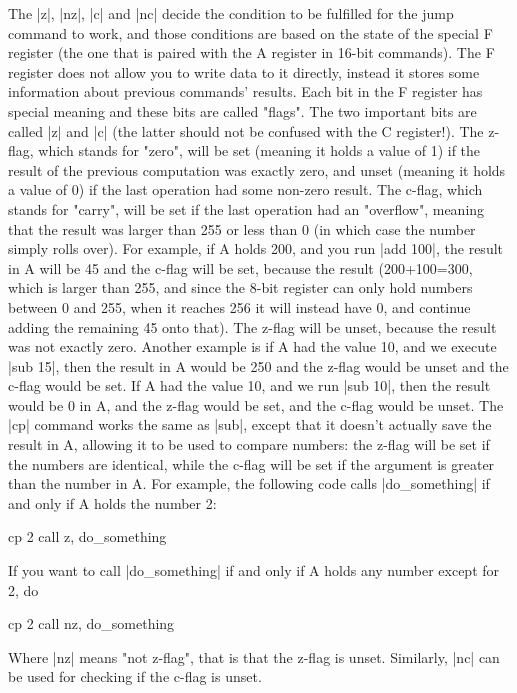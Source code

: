 \documentclass[11pt]{book}
\begin{document}
The |z|, |nz|, |c| and |nc| decide the condition to be fulfilled for the jump command to work, and those conditions are based on the state of the special F register (the one that is paired with the A register in 16-bit commands). The F register does not allow you to write data to it directly, instead it stores some information about previous commands' results. Each bit in the F register has special meaning and these bits are called "flags". The two important bits are called |z| and |c| (the latter should not be confused with the C register!). The z-flag, which stands for "zero", will be set (meaning it holds a value of 1) if the result of the previous computation was exactly zero, and unset (meaning it holds a value of 0) if the last operation had some non-zero result. The c-flag, which stands for "carry", will be set if the last operation had an "overflow", meaning that the result was larger than 255 or less than 0 (in which case the number simply rolls over). For example, if A holds 200, and you run |add 100|, the result in A will be 45 and the c-flag will be set, because the result (200+100=300, which is larger than 255, and since the 8-bit register can only hold numbers between 0 and 255, when it reaches 256 it will instead have 0, and continue adding the remaining 45 onto that). The z-flag will be unset, because the result was not exactly zero. Another example is if A had the value 10, and we execute |sub 15|, then the result in A would be 250 and the z-flag would be unset and the c-flag would be set. If A had the value 10, and we run |sub 10|, then the result would be 0 in A, and the z-flag would be set, and the c-flag would be unset. The |cp| command works the same as |sub|, except that it doesn't actually save the result in A, allowing it to be used to compare numbers: the z-flag will be set if the numbers are identical, while the c-flag will be set if the argument is greater than the number in A. For example, the following code calls |do_something| if and only if A holds the number 2:

\begin{code}
cp 2 
call z, do_something 
\end{code}

If you want to call |do_something| if and only if A holds any number except for 2, do 

\begin{code}
cp 2
call nz, do_something 
\end{code}

Where |nz| means "not z-flag", that is that the z-flag is unset. Similarly, |nc| can be used for checking if the c-flag is unset.
\end{document}
